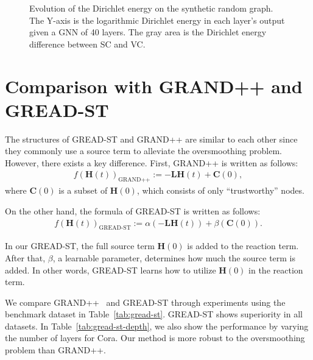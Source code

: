 \documentclass{article}
\theoremstyle{plain}
\theoremstyle{definition}
\theoremstyle{remark}
\begin{document}
\begin{figure}[ht!]
    \centering
    \caption{Evolution of the Dirichlet energy on the synthetic random graph. The Y-axis is the logarithmic Dirichlet energy in each layer’s output given a GNN of 40 layers. The gray area is the Dirichlet energy difference between SC and VC.}
    \label{fig:energy_beta}
\end{figure}

\clearpage

\section{Comparison with GRAND++ and GREAD-ST}
The structures of GREAD-ST and GRAND++ are similar to each other since they commonly use a source term to alleviate the oversmoothing problem. However, there exists a key difference. First, GRAND++ is written as follows:
\begin{align}
    f(\mathbf{H}(t))_{\text{GRAND++}} := -\mathbf{L}\mathbf{H}(t) + \mathbf{C}(0),
\end{align}
where $\mathbf{C}(0)$ is a subset of $\mathbf{H}(0)$, which consists of only “trustworthy” nodes.

On the other hand, the formula of GREAD-ST is written as follows:
\begin{align}
    f(\mathbf{H}(t))_{\text{GREAD-ST}} := \alpha (-\mathbf{L}\mathbf{H}(t)) + \beta(\mathbf{C}(0)).
\end{align}

In our GREAD-ST, the full source term $\mathbf{H}(0)$ is added to the reaction term. After that, $\beta$, a learnable parameter, determines how much the source term is added. In other words, GREAD-ST learns how to utilize $\mathbf{H}(0)$ in the reaction term.

We compare GRAND++~\cite{thorpe2022grands} and GREAD-ST through experiments using the benchmark dataset in Table~\ref{tab:gread-st}. GREAD-ST shows superiority in all datasets. In Table~\ref{tab:gread-st-depth}, we also show the performance by varying the number of layers for Cora. Our method is more robust to the oversmoothing problem than GRAND++.
\end{document}
